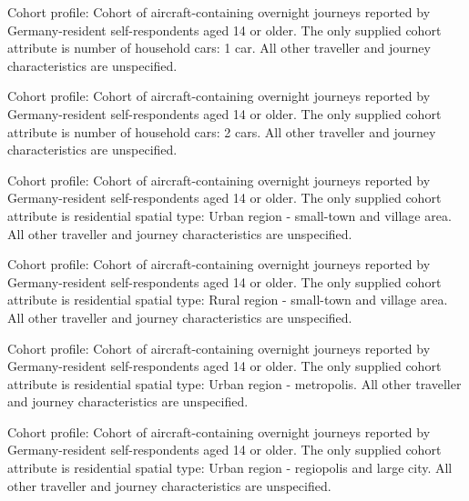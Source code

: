 \begin{promptbox}[title={Number of household cars: 1 car}]
Cohort profile: Cohort of aircraft-containing overnight journeys reported by Germany-resident self-respondents aged 14 or older. The only supplied cohort attribute is number of household cars: 1 car. All other traveller and journey characteristics are unspecified.
\end{promptbox}


\begin{promptbox}[title={Number of household cars: 2 cars}]
Cohort profile: Cohort of aircraft-containing overnight journeys reported by Germany-resident self-respondents aged 14 or older. The only supplied cohort attribute is number of household cars: 2 cars. All other traveller and journey characteristics are unspecified.
\end{promptbox}


\begin{promptbox}[title={Residential spatial type: Urban region - small-town and village area}]
Cohort profile: Cohort of aircraft-containing overnight journeys reported by Germany-resident self-respondents aged 14 or older. The only supplied cohort attribute is residential spatial type: Urban region - small-town and village area. All other traveller and journey characteristics are unspecified.
\end{promptbox}


\begin{promptbox}[title={Residential spatial type: Rural region - small-town and village area}]
Cohort profile: Cohort of aircraft-containing overnight journeys reported by Germany-resident self-respondents aged 14 or older. The only supplied cohort attribute is residential spatial type: Rural region - small-town and village area. All other traveller and journey characteristics are unspecified.
\end{promptbox}


\begin{promptbox}[title={Residential spatial type: Urban region - metropolis}]
Cohort profile: Cohort of aircraft-containing overnight journeys reported by Germany-resident self-respondents aged 14 or older. The only supplied cohort attribute is residential spatial type: Urban region - metropolis. All other traveller and journey characteristics are unspecified.
\end{promptbox}


\begin{promptbox}[title={Residential spatial type: Urban region - regiopolis and large city}]
Cohort profile: Cohort of aircraft-containing overnight journeys reported by Germany-resident self-respondents aged 14 or older. The only supplied cohort attribute is residential spatial type: Urban region - regiopolis and large city. All other traveller and journey characteristics are unspecified.
\end{promptbox}


